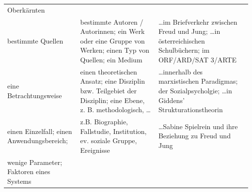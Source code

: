 \documentclass[]{book}
\theoremstyle{definition}
\theoremstyle{definition}
\theoremstyle{definition}
\theoremstyle{remark}
\begin{document}
\begin{longtable}[]{@{}lll@{}}
\begin{minipage}[t]{0.30\columnwidth}
Oberkärnten\vspace{5mm}\strut
\end{minipage}\tabularnewline
\begin{minipage}[t]{0.31\columnwidth}\raggedright\strut
bestimmte Quellen\strut
\end{minipage} & \begin{minipage}[t]{0.30\columnwidth}\raggedright\strut
bestimmte Autoren / Autorinnen; ein Werk oder eine Gruppe von Werken;
einen Typ von Quellen; ein Medium\strut
\end{minipage} & \begin{minipage}[t]{0.30\columnwidth}\raggedright\strut
\ldots{}im Briefverkehr zwischen Freud und Jung; \ldots{}in
österreichischen Schulbüchern; im ORF/ARD/SAT 3/ARTE\strut
\end{minipage}\tabularnewline
\begin{minipage}[t]{0.31\columnwidth}\raggedright\strut
eine Betrachtungsweise\strut
\end{minipage} & \begin{minipage}[t]{0.30\columnwidth}\raggedright\strut
einen theoretischen Ansatz; eine Disziplin bzw. Teilgebiet der
Disziplin; eine Ebene, z. B. methodologisch, \ldots{}\strut
\end{minipage} & \begin{minipage}[t]{0.30\columnwidth}\raggedright\strut
\ldots{}innerhalb des marxistischen Paradigmas; der Sozialpsycholgie;
\ldots{}in Giddens' Strukturationstheorin\vspace{5mm}\strut
\end{minipage}\tabularnewline
\begin{minipage}[t]{0.31\columnwidth}\raggedright\strut
einen Einzelfall; einen Anwendungsbereich;\strut
\end{minipage} & \begin{minipage}[t]{0.30\columnwidth}\raggedright\strut
z.B. Biographie, Fallstudie, Institution, ev. soziale Gruppe,
Ereignisse\strut
\end{minipage} & \begin{minipage}[t]{0.30\columnwidth}\raggedright\strut
\ldots{}Sabine Spielrein und ihre Beziehung zu Freud und
Jung\vspace{5mm}\strut
\end{minipage}\tabularnewline
\begin{minipage}[t]{0.31\columnwidth}\raggedright\strut
wenige Parameter; Faktoren eines Systems\strut
\end{minipage} & \begin{minipage}[t]{0.30\columnwidth}\raggedright\strut

\end{minipage}
\end{longtable}
\end{document}
